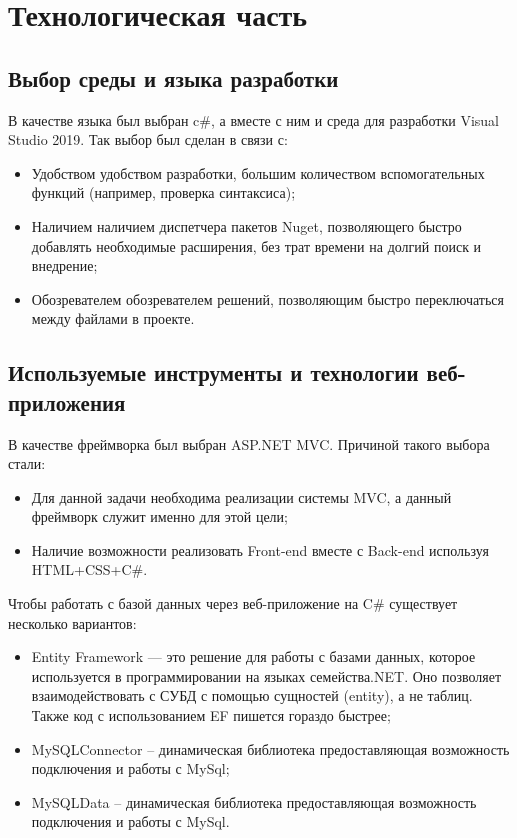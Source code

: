 \chapter{Технологическая часть}

\section{Выбор среды и языка разработки}

\hspace{0.6cm} В качестве языка был выбран c\#, а вместе с ним и среда для разработки Visual Studio 2019. Так выбор был сделан в связи с:

\begin{itemize}
  \item Удобством удобством разработки, большим количеством вспомогательных функций (например, проверка синтаксиса);
  \item Наличием наличием диспетчера пакетов Nuget, позволяющего быстро добавлять необходимые расширения, без трат времени на долгий поиск и внедрение;
  \item Обозревателем обозревателем решений, позволяющим быстро переключаться между файлами в проекте.
\end{itemize}


\section{Используемые инструменты и технологии веб-приложения}

\hspace{0.6cm} В качестве фреймворка был выбран ASP.NET MVC. Причиной такого выбора стали:

\begin{itemize}
  \item Для данной задачи необходима реализации системы MVC, а данный фреймворк служит именно для этой цели;
  \item Наличие возможности реализовать Front-end вместе с Back-end используя HTML+CSS+C\#.
\end{itemize}

\hspace{0.6cm} Чтобы работать с базой данных через веб-приложение на C\# существует несколько вариантов:

\begin{itemize}
  \item Entity Framework — это решение для работы с базами данных, которое используется в программировании на языках семейства.NET. Оно позволяет взаимодействовать с СУБД с помощью сущностей (entity), а не таблиц. Также код с использованием EF пишется гораздо быстрее;
  \item MySQLConnector – динамическая библиотека предоставляющая возможность подключения и работы с MySql;
  \item MySQLData – динамическая библиотека предоставляющая возможность подключения и работы с MySql.
\end{itemize}


